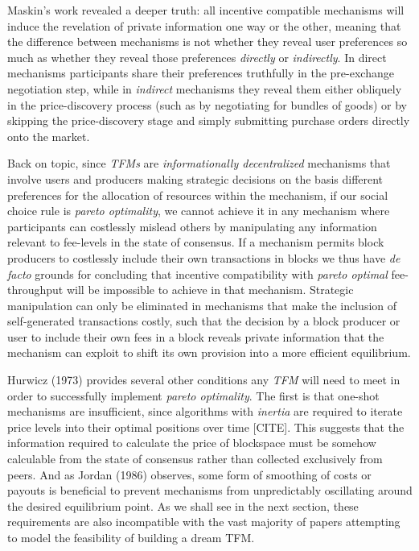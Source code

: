 Maskin's work revealed a deeper truth: all incentive compatible mechanisms will induce the revelation of private information one way or the other, meaning that the difference between mechanisms is not whether they reveal user preferences so much as whether they reveal those preferences \textit{directly} or \textit{indirectly}. In direct mechanisms participants share their preferences truthfully in the pre-exchange negotiation step, while in \textit{indirect} mechanisms they reveal them either obliquely in the price-discovery process (such as by negotiating for bundles of goods) or by skipping the price-discovery stage and simply submitting purchase orders directly onto the market.

Back on topic, since \textit{TFMs} are \textit{informationally decentralized} mechanisms that involve users and producers making strategic decisions on the basis different preferences for the allocation of resources within the mechanism, if our social choice rule is \textit{pareto optimality}, we cannot achieve it in any mechanism where participants can costlessly mislead others by manipulating any information relevant to fee-levels in the state of consensus. If a mechanism permits block producers to costlessly include their own transactions in blocks we thus have \textit{de facto} grounds for concluding that incentive compatibility with \textit{pareto optimal} fee-throughput will be impossible to achieve in that mechanism. Strategic manipulation can only be eliminated in mechanisms that make the inclusion of self-generated transactions costly, such that the decision by a block producer or user to include their own fees in a block reveals private information that the mechanism can exploit to shift its own provision into a more efficient equilibrium.

Hurwicz (1973) provides several other conditions any \textit{TFM} will need to meet in order to successfully implement \textit{pareto optimality}. The first is that one-shot mechanisms are insufficient, since algorithms with \textit{inertia} are required to iterate price levels into their optimal positions over time [CITE]. This suggests that the information required to calculate the price of blockspace must be somehow calculable from the state of consensus rather than collected exclusively from peers. And as Jordan (1986) observes, some form of smoothing of costs or payouts is beneficial to prevent mechanisms from unpredictably oscillating around the desired equilibrium point. As we shall see in the next section, these requirements are also incompatible with the vast majority of papers attempting to model the feasibility of building a dream TFM. 


